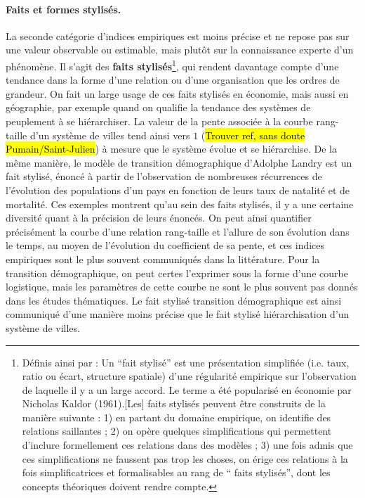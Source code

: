 \paragraph{Faits et formes stylisés.}
La seconde catégorie d'indices empiriques est moins précise et ne repose pas sur une valeur observable ou estimable, mais plutôt sur la connaissance experte d'un phénomène.
Il s'agit des \og \textbf{faits stylisés}\fg{}\footnote{
	Définis ainsi par \autocite{livet2014diversite}: \og
	Un ``fait stylisé'' est une présentation simplifiée (i.e. taux, ratio ou écart, structure spatiale) d'une régularité empirique sur l'observation de laquelle il y a un large accord.
	Le terme a été popularisé en économie par Nicholas Kaldor (1961).[Les] faits stylisés peuvent être construits de la manière suivante :
	1) en partant du domaine empirique, on identifie des relations saillantes ; 2) on opère quelques simplifications qui permettent d'inclure formellement ces relations dans des modèles ; 3) une fois admis que ces simplifications ne faussent pas trop les choses, on érige ces relations à la fois simplificatrices et formalisables au rang de `` faits stylisés'', dont les concepts théoriques doivent rendre compte.\fg{}
}, qui rendent davantage compte d'une tendance dans la forme d'une relation ou d'une organisation que les ordres de grandeur.
On fait un large usage de ces faits stylisés en économie, mais aussi en géographie, par exemple quand on qualifie la tendance des systèmes de peuplement à se hiérarchiser.
La valeur de la pente associée à la courbe rang-taille d'un système de villes tend ainsi vers $1$ (\hl{Trouver ref, sans doute Pumain/Saint-Julien}) à mesure que le système évolue et se hiérarchise.
De la même manière, le modèle de transition démographique d'Adolphe Landry est un fait stylisé, énoncé à partir de l'observation de nombreuses récurrences de l'évolution des populations d'un pays en fonction de leurs taux de natalité et de mortalité.
Ces exemples montrent qu'au sein des faits stylisés, il y a une certaine diversité quant à la précision de leurs énoncés.
On peut ainsi quantifier précisément la courbe d'une relation rang-taille et l'allure de son évolution dans le temps, au moyen de l'évolution du coefficient de sa pente, et ces indices empiriques sont le plus souvent communiqués dans la littérature.
Pour la transition démographique, on peut certes l'exprimer sous la forme d'une courbe logistique, mais les paramètres de cette courbe ne sont le plus souvent pas donnés dans les études thématiques.
Le fait stylisé \og transition démographique\fg{} est ainsi communiqué d'une manière moins précise que le fait stylisé \og hiérarchisation d'un système de villes\fg{}.


